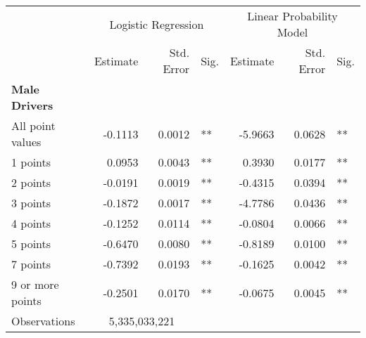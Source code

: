 
\begin{table}%
\centering 
\begin{tabular}{l r r l r r l} 

\hline 
 
 & \multicolumn{3}{c}{Logistic Regression}  & \multicolumn{3}{c}{Linear Probability Model} \\ 

 \cmidrule(lr){2-4}\cmidrule(lr){5-7} 
 & Estimate & Std. Error & Sig. & Estimate & Std. Error & Sig. \\ 

\hline 
 
\textbf{Male Drivers} \\ 
\hline
All point values                &  -0.1113        &  0.0012       &   **       &  -5.9663        &  0.0628       &   **       \\ 
1 points                        &  0.0953        &  0.0043       &   **       &  0.3930        &  0.0177       &   **       \\ 
2 points                        &  -0.0191        &  0.0019       &   **       &  -0.4315        &  0.0394       &   **       \\ 
3 points                        &  -0.1872        &  0.0017       &   **       &  -4.7786        &  0.0436       &   **       \\ 
4 points                        &  -0.1252        &  0.0114       &   **       &  -0.0804        &  0.0066       &   **       \\ 
5 points                        &  -0.6470        &  0.0080       &   **       &  -0.8189        &  0.0100       &   **       \\ 
7 points                        &  -0.7392        &  0.0193       &   **       &  -0.1625        &  0.0042       &   **       \\ 
9 or more points                &  -0.2501        &  0.0170       &   **       &  -0.0675        &  0.0045       &   **       \\ 
Observations            & \multicolumn{2}{c}{5,335,033,221} \\
         
\hline 


\end{tabular}
\end{table}

